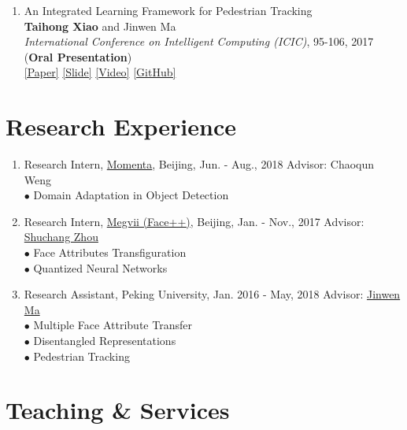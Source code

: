 \documentclass[letterpaper]{article}
\begin{document}
\begin{enumerate}
\item An Integrated Learning Framework for Pedestrian Tracking\\
	{\bf Taihong Xiao} and Jinwen Ma\\
	{\it International Conference on Intelligent Computing (ICIC)}, 95-106, 2017 ({\bf Oral Presentation})\\
	\href{https://link.springer.com/chapter/10.1007\%2F978-3-319-63315-2_9}{[Paper]}
	\href{https://prinsphield.github.io/extra/ICIC-20170808.pdf}{[Slide]}
	\href{https://youtu.be/HQIi0Z9b4Pw}{[Video]}
	\href{https://github.com/Prinsphield/ILFPT}{[GitHub]}

\end{enumerate}



\section*{Research Experience}

\begin{enumerate}

\item Research Intern, \href{https://www.momenta.ai/en/}{Momenta}, Beijing, Jun. - Aug., 2018 \hfill Advisor: Chaoqun Weng\\
	$\bullet$ Domain Adaptation in Object Detection

\item Research Intern, \href{https://www.faceplusplus.com}{Megvii (Face++)}, Beijing, Jan. - Nov., 2017 \hfill Advisor: \href{https://zsc.github.io/}{Shuchang Zhou}\\
	$\bullet$ Face Attributes Transfiguration\\
	$\bullet$ Quantized Neural Networks

\item Research Assistant, Peking University, Jan. 2016 - May, 2018 \hfill Advisor: \href{http://www.math.pku.edu.cn/is/~jwma/}{Jinwen Ma}\\
	$\bullet$ Multiple Face Attribute Transfer\\
	$\bullet$ Disentangled Representations\\
	$\bullet$ Pedestrian Tracking
	
\end{enumerate}


\section*{Teaching \& Services}
\end{document}
